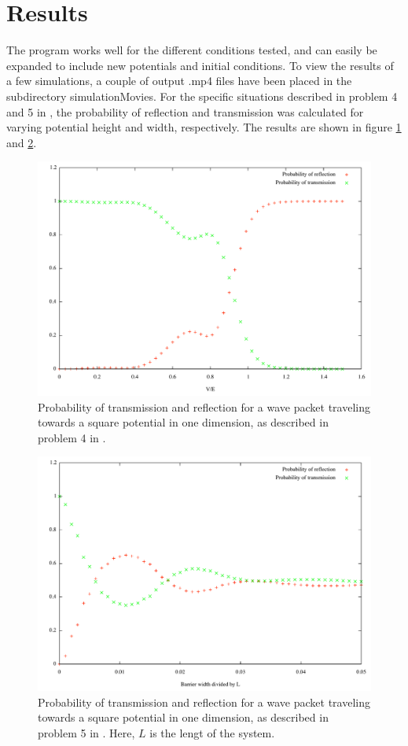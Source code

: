 \documentclass[5p]{elsarticle}       			%
\begin{document}
\section{Results}
The program works well for the different conditions tested, and can easily be expanded to include new potentials and initial conditions. To view the results of a few simulations, a couple of output .mp4 files have been placed in the subdirectory simulationMovies. For the specific situations described in problem 4 and 5 in \cite{exercise}, the probability of reflection and transmission was calculated for varying potential height and width, respectively. The results are shown in figure \ref{oppg4} and \ref{oppg5}.
\begin{figure}[h] 
	\begin{center}
		\includegraphics[width=.5\textwidth,center]{oppgave4.pdf} 
	\end{center}
		\caption{Probability of transmission and reflection for a wave packet traveling towards a square potential in one dimension, as described in problem 4 in \cite{exercise}.} 
		\label{oppg4}
\end{figure}
\begin{figure}[h] 
	\begin{center}
		\includegraphics[width=.5\textwidth,center]{oppgave5.pdf} 
	\end{center}
		\caption{Probability of transmission and reflection for a wave packet traveling towards a square potential in one dimension, as described in problem 5 in \cite{exercise}. Here, $L$ is the lengt of the system.} 
		\label{oppg5}
\end{figure}
\end{document}
